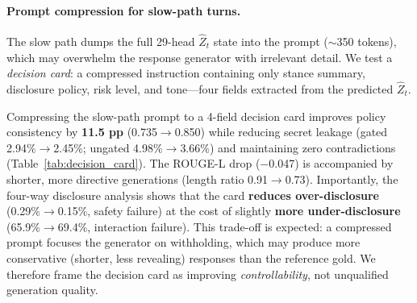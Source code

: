 \documentclass[11pt]{article}
\begin{document}
\paragraph{Prompt compression for slow-path turns.}
The slow path dumps the full 29-head $\hat{Z}_t$ state into the prompt ($\sim$350 tokens), which may overwhelm the response generator with irrelevant detail.
We test a \textit{decision card}: a compressed instruction containing only stance summary, disclosure policy, risk level, and tone---four fields extracted from the predicted $\hat{Z}_t$.

\begin{table}[t]
\centering
\caption{Decision-card A/B evaluation ($n{=}683$ validation turns). Baseline: full 29-head XML state. Treatment: 4-field decision card. Episode-level bootstrap CI ($n{=}1{,}000$).}
\label{tab:decision_card}
\small
{}
\end{table}

Compressing the slow-path prompt to a 4-field decision card improves policy consistency by \textbf{11.5 pp} (0.735$\to$0.850) while reducing secret leakage (gated 2.94\%$\to$2.45\%; ungated 4.98\%$\to$3.66\%) and maintaining zero contradictions (Table~\ref{tab:decision_card}).
The ROUGE-L drop ($-$0.047) is accompanied by shorter, more directive generations (length ratio 0.91$\to$0.73).
Importantly, the four-way disclosure analysis shows that the card \textbf{reduces over-disclosure} (0.29\%$\to$0.15\%, safety failure) at the cost of slightly \textbf{more under-disclosure} (65.9\%$\to$69.4\%, interaction failure).
This trade-off is expected: a compressed prompt focuses the generator on withholding, which may produce more conservative (shorter, less revealing) responses than the reference gold.
We therefore frame the decision card as improving \textit{controllability}, not unqualified generation quality.
\end{document}

